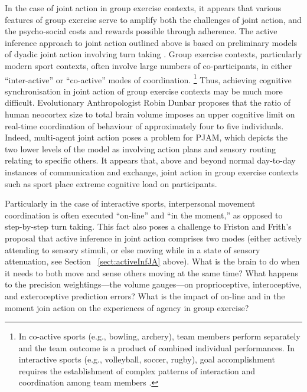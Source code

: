 \begin{CJK}{UTF8}{gbsn}
In the case of joint action in group exercise contexts, it appears that various features of group exercise serve to amplify both the challenges of joint action, and the psycho-social costs and rewards possible through adherence.  The active inference approach to joint action outlined above is based on preliminary models of dyadic joint action involving turn taking \citep[i.e., in bird song exchanges][]{Friston2015}.  Group exercise contexts, particularly modern sport contexts, often involve large numbers of co-participants, in either ``inter-active'' or ``co-active'' modes of coordination.
    \footnote{
    In co-active sports (e.g., bowling, archery), team members perform separately and the team outcome is a product of combined individual performances. In interactive sports (e.g., volleyball, soccer, rugby), goal accomplishment requires the establishment of complex patterns of interaction and coordination among team members \citep{Filho2014}.
    }
Thus, achieving cognitive synchronisation in joint action of group exercise contexts may be much more difficult.  Evolutionary Anthropologist Robin Dunbar \textcite{Dunbar1992} proposes that the ratio of human neocortex size to total brain volume imposes an upper cognitive limit on real-time coordination of behaviour of approximately four to five individuals.  Indeed, multi-agent joint action poses a problem for PJAM, which depicts the two lower levels of the model as involving action plans and sensory routing relating to specific others. It appears that, above and beyond normal day-to-day instances of communication and exchange, joint action in group exercise contexts such as sport place extreme cognitive load on participants.

Particularly in the case of interactive sports, interpersonal movement coordination is often executed ``on-line'' and ``in the moment,'' as opposed to step-by-step turn taking.  This fact also poses a challenge to Friston and Frith's proposal that active inference in joint action comprises two modes (either actively attending to sensory stimuli, or else moving while in a state of sensory attenuation, see Section ~\ref{sect:activeInfJA} above).  What is the brain to do when it needs to both move and sense others moving at the same time?  What happens to the precision weightings---the volume gauges---on proprioceptive, interoceptive, and exteroceptive prediction errors?  What is the impact of on-line and in the moment join action on the experiences of agency in group exercise?


\end{CJK}
